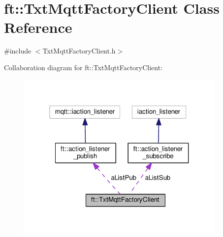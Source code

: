 \hypertarget{classft_1_1_txt_mqtt_factory_client}{}\section{ft\+:\+:Txt\+Mqtt\+Factory\+Client Class Reference}
\label{classft_1_1_txt_mqtt_factory_client}


{\ttfamily \#include $<$Txt\+Mqtt\+Factory\+Client.\+h$>$}



Collaboration diagram for ft\+:\+:Txt\+Mqtt\+Factory\+Client\+:
\nopagebreak
\begin{figure}[H]
\begin{center}
\leavevmode
\includegraphics[width=292pt]{classft_1_1_txt_mqtt_factory_client__coll__graph}
\end{center}
\end{figure}
